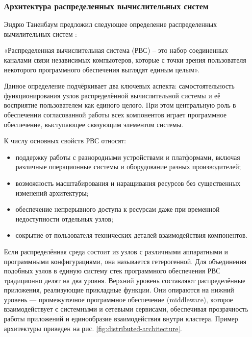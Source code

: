 \subsubsection{Архитектура распределенных вычислительных систем}

Эндрю Таненбаум предложил следующее определение распределенных вычилительных
систем \cite{tanenbaum_distributed_systems}:

«Распределенная вычислительная система (РВС) – это набор соединенных каналами
связи независимых компьютеров, которые с точки зрения пользователя некоторого
программного обеспечения выглядят единым целым».

Данное определение подчёркивает два ключевых аспекта: самостоятельность
функционирования узлов распределённой вычислительной системы и её восприятие
пользователем как единого целого. При этом центральную роль в обеспечении
согласованной работы всех компонентов играет программное обеспечение,
выступающее связующим элементом системы.

К числу основных свойств РВС относят:
\begin{itemize}
    \item поддержку работы с разнородными устройствами и платформами, включая
        различные операционные системы и оборудование разных производителей;
    \item возможность масштабирования и наращивания ресурсов без существенных
        изменений архитектуры;
    \item обеспечение непрерывного доступа к ресурсам даже при временной
        недоступности отдельных узлов;
    \item сокрытие от пользователя технических деталей взаимодействия
        компонентов.
\end{itemize}

Если распределённая среда состоит из узлов с различными аппаратными и
программными конфигурациями, она называется гетерогенной. Для объединения
подобных узлов в единую систему стек программного обеспечения РВС традиционно
делят на два уровня. Верхний уровень составляют распределённые приложения,
реализующие прикладные функции. Они опираются на нижний уровень — промежуточное
программное обеспечение (middleware), которое взаимодействует с системными и
сетевыми сервисами, обеспечивая прозрачность работы приложений и единообразие
взаимодействия внутри кластера. Пример архитектуры приведен на рис.
\ref{fig:distributed-architecture}.

